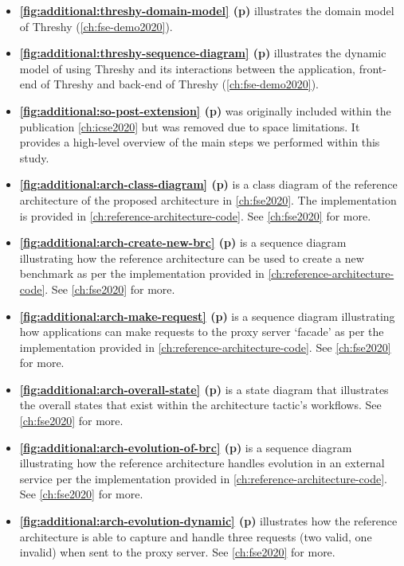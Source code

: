 \begin{itemize}
\item \textbf{\cref{fig:additional:threshy-domain-model} (p\pageref{fig:additional:threshy-domain-model})}
  illustrates the domain model of Threshy (\cref{ch:fse-demo2020}).
\item \textbf{\cref{fig:additional:threshy-sequence-diagram} (p\pageref{fig:additional:threshy-sequence-diagram})}
  illustrates the dynamic model of using Threshy and its interactions between the application, front-end of Threshy and back-end of Threshy (\cref{ch:fse-demo2020}).
\item \textbf{\cref{fig:additional:so-post-extension} (p\pageref{fig:additional:so-post-extension})}
  was originally included within the publication \cref{ch:icse2020} but was removed due to space limitations. It provides a high-level overview of the main steps we performed within this study.
\item \textbf{\cref{fig:additional:arch-class-diagram} (p\pageref{fig:additional:arch-class-diagram})}
  is a class diagram of the reference architecture of the proposed architecture in \cref{ch:fse2020}. The implementation is provided in \cref{ch:reference-architecture-code}. See \cref{ch:fse2020} for more.
\item \textbf{\cref{fig:additional:arch-create-new-brc} (p\pageref{fig:additional:arch-create-new-brc})}
  is a sequence diagram illustrating how the reference architecture can be used to create a new benchmark as per the implementation provided in \cref{ch:reference-architecture-code}. See \cref{ch:fse2020} for more.
\item \textbf{\cref{fig:additional:arch-make-request} (p\pageref{fig:additional:arch-make-request})}
  is a sequence diagram illustrating how applications can make requests to the proxy server `facade' as per the implementation provided in \cref{ch:reference-architecture-code}. See \cref{ch:fse2020} for more.
\item \textbf{\cref{fig:additional:arch-overall-state} (p\pageref{fig:additional:arch-overall-state})}
  is a state diagram that illustrates the overall states that exist within the architecture tactic's workflows. See \cref{ch:fse2020} for more.
\item \textbf{\cref{fig:additional:arch-evolution-of-brc} (p\pageref{fig:additional:arch-evolution-of-brc})}
  is a sequence diagram illustrating how the reference architecture handles evolution in an external service per the implementation provided in \cref{ch:reference-architecture-code}. See \cref{ch:fse2020} for more.
\item \textbf{\cref{fig:additional:arch-evolution-dynamic} (p\pageref{fig:additional:arch-evolution-dynamic})}
  illustrates how the reference architecture is able to capture and handle three requests (two valid, one invalid) when sent to the proxy server. See \cref{ch:fse2020} for more.
\end{itemize}

